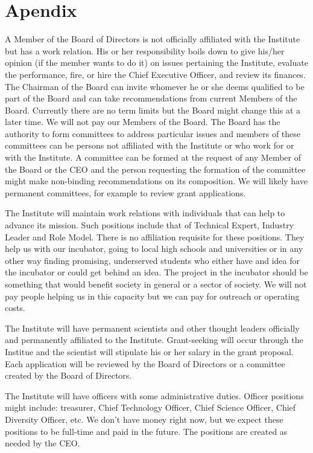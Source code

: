 \section{Apendix}

A Member of the Board of Directors is not officially affiliated with the Institute but has a work relation. His or her responsibility boils down to give his/her opinion (if the member wants to do it) on issues pertaining the Institute, evaluate the performance, fire, or hire the Chief Executive Officer, and review its finances. The Chairman of the Board can invite whomever he or she deems qualified to be part of the Board and can take recommendations from current Members of the Board. Currently there are no term limits but the Board might change this at a later time. We will not pay our Members of the Board. The Board has the authority to form committees to address particular issues and members of these committees can be persons not affiliated with the Institute or who work for or with the Institute. A committee can be formed at the request of any Member of the Board or the CEO and the person requesting the formation of the committee might make non-binding recommendations on its composition. We will likely have permanent committees, for example to review grant applications.

The Institute will maintain work relations with individuals that can help to advance its mission. Such positions include that of Technical Expert, Industry Leader and Role Model. There is no affiliation requisite for these positions. They help us with our incubator, going to local high schools and universities or in any other way finding promising, underserved students who either have and idea for the incubator or could get behind an idea. The project in the incubator should be something that would benefit society in general or a sector of society. We will not pay people helping us in this capacity but we can pay for outreach or operating costs.

The Institute will have permanent scientists and other thought leaders officially and permanently affiliated to the Institute. Grant-seeking will occur through the Institue and the scientist will stipulate his or her salary in the grant proposal. Each application will be reviewed by the Board of Directors or a committee created by the Board of Directors.

The Institute will have officers with some administrative duties. Officer positions might include: treasurer, Chief Technology Officer, Chief Science Officer, Chief Diversity Officer, etc. We don't have money right now, but we expect these positions to be full-time and paid in the future. The positions are created as needed by the CEO. 
